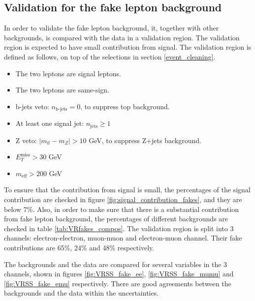 \subsection{Validation for the fake lepton background}
In order to validate the fake lepton background, it, together with other backgrounds, is compared with the data in a validation region.
The validation region is expected to have small contribution from signal.
The validation region is defined as follows, on top of the selections in section \ref{event_cleaning}.
\begin{itemize}
\item The two leptons are signal leptons.
\item The two leptons are same-sign.
\item b-jets veto: $n_{\text{b-jets}} = 0$, to suppress top background.
\item At least one signal jet: $n_{\text{jets}} \geq 1$
\item Z veto: $|m_{ll} - m_Z| > 10$ GeV, to suppress Z+jets background.
\item $E_{T}^{\text{miss}} > 30$ GeV
\item $m_{\text{eff}} > 200$ GeV
\end{itemize}

To ensure that the contribution from signal is small, the percentages of the signal contribution are checked in figure \ref{fig:signal_contribution_fakes}, and they are below 7\%.
Also, in order to make sure that there is a substantial contribution from fake lepton background, the percentages of different backgrounds are checked in table \ref{tab:VRfakes_compos}.
The validation region is split into 3 channels: electron-electron, muon-muon and electron-muon channel.
Their fake contributions are 65\%,  24\% and 48\% respectively.

The backgrounds and the data are compared for several variables in the 3 channels, shown in figures \ref{fig:VRSS_fake_ee}, \ref{fig:VRSS_fake_mumu} and \ref{fig:VRSS_fake_emu} respectively.
There are good agreements between the backgrounds and the data within the uncertainties.

